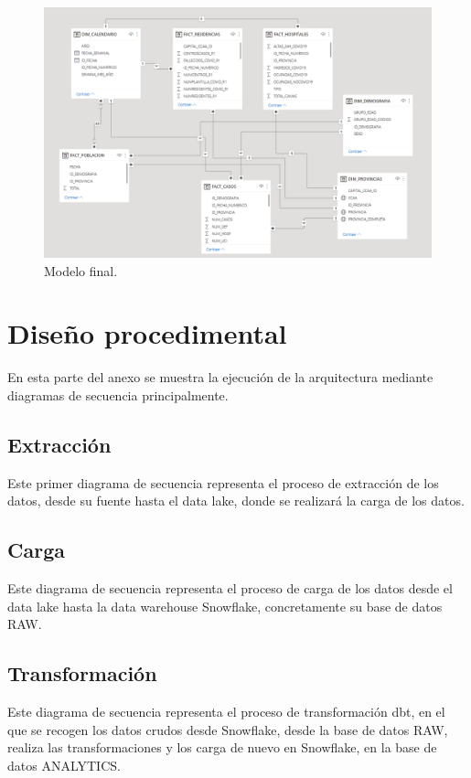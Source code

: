\begin{figure}[h]
    \advance\leftskip-2cm 
    \includegraphics[scale=0.7]{img/modelo-final.PNG}
    \caption{Modelo final.}
\end{figure}
\section{Diseño procedimental}
En esta parte del anexo se muestra la ejecución de la arquitectura mediante diagramas de secuencia principalmente.

\subsection{Extracción}
Este primer diagrama de secuencia representa el proceso de extracción de los datos, desde su fuente hasta el data lake, donde se realizará la carga de los datos.

\subsection{Carga}
Este diagrama de secuencia representa el proceso de carga de los datos desde el data lake hasta la data warehouse Snowflake, concretamente su base de datos RAW.

\subsection{Transformación}
Este diagrama de secuencia representa el proceso de transformación dbt, en el que se recogen los datos crudos desde Snowflake, desde la base de datos RAW, realiza las transformaciones y los carga de nuevo en Snowflake, en la base de datos ANALYTICS.
